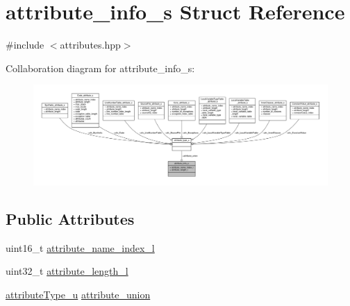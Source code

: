 \hypertarget{structattribute__info__s}{\section{attribute\+\_\+info\+\_\+s Struct Reference}
\label{structattribute__info__s}
}


{\ttfamily \#include $<$attributes.\+hpp$>$}



Collaboration diagram for attribute\+\_\+info\+\_\+s\+:\nopagebreak
\begin{figure}[H]
\begin{center}
\leavevmode
\includegraphics[width=350pt]{structattribute__info__s__coll__graph}
\end{center}
\end{figure}
\subsection*{Public Attributes}
\begin{DoxyCompactItemize}
\item 
uint16\+\_\+t \hyperlink{structattribute__info__s_a21689252627ef43920efed54f5a9e69e}{attribute\+\_\+name\+\_\+index\+\_\+l}
\item 
uint32\+\_\+t \hyperlink{structattribute__info__s_a05108c8ce025ccef6f5dd8f2db872253}{attribute\+\_\+length\+\_\+l}
\item 
\hyperlink{attributes_8hpp_a1f6857b772af6ea7fc2f978b57567f0d}{attribute\+Type\+\_\+u} \hyperlink{structattribute__info__s_a1ca989905be28a2dfe09758a89593b91}{attribute\+\_\+union}
\end{DoxyCompactItemize}


